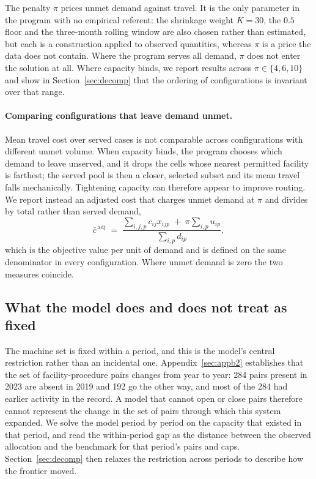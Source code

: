 The penalty $\pi$ prices unmet demand against travel. It is the only parameter
in the program with no empirical referent: the shrinkage weight $K = 30$, the
$0.5$ floor and the three-month rolling window are also chosen rather than
estimated, but each is a construction applied to observed quantities, whereas
$\pi$ is a price the data does not contain. Where the program serves all demand, $\pi$ does not enter the
solution at all. Where capacity binds, we report results across $\pi \in
\{4, 6, 10\}$ and show in Section~\ref{sec:decomp} that the ordering of
configurations is invariant over that range.

\paragraph{Comparing configurations that leave demand unmet.} Mean travel cost
over served cases is not comparable across configurations with different unmet
volume. When capacity binds, the program chooses which demand to leave unserved,
and it drops the cells whose nearest permitted facility is farthest; the served
pool is then a closer, selected subset and its mean travel falls mechanically.
Tightening capacity can therefore appear to improve routing. We report instead
an adjusted cost that charges unmet demand at $\pi$ and divides by total rather
than served demand,
\[
\bar{c}^{\,\text{adj}} \;=\; \frac{\sum_{i,j,p} c_{ij} x_{ijp} \;+\; \pi \sum_{i,p} u_{ip}}{\sum_{i,p} d_{ip}},
\]
which is the objective value per unit of demand and is defined on the same
denominator in every configuration. Where unmet demand is zero the two measures
coincide.

\subsection{What the model does and does not treat as fixed}
\label{sec:fixed}

The machine set is fixed within a period, and this is the model's central
restriction rather than an incidental one. Appendix~\ref{sec:appb2} establishes that the set of facility-procedure pairs changes from year to year: 284 pairs
present in 2023 are absent in 2019 and 192 go the other way, and most of the 284
had earlier activity in the record. A model that cannot open or close pairs therefore
cannot represent the change in the set of pairs through which this system expanded. We
solve the model period by period on the capacity that existed in that period,
and read the within-period gap as the distance between the observed allocation and the benchmark for that period's pairs and caps.
Section~\ref{sec:decomp} then relaxes the restriction across periods to
describe how the frontier moved.

